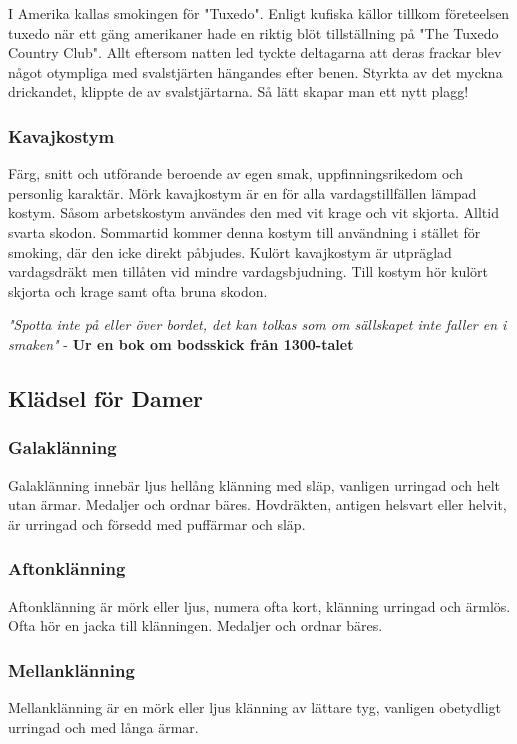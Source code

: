I Amerika kallas smokingen för "Tuxedo". Enligt kufiska källor tillkom företeelsen tuxedo när ett gäng amerikaner hade en riktig blöt tillställning på "The Tuxedo Country Club". Allt eftersom natten led tyckte deltagarna att deras frackar blev något otympliga med svalstjärten hängandes efter benen. Styrkta av det myckna drickandet, klippte de av svalstjärtarna. Så lätt skapar man ett nytt plagg!

\subsubsection*{\textbf{Kavajkostym}}

Färg, snitt och utförande beroende av egen smak, uppfinningsrikedom och personlig karaktär. Mörk kavajkostym är en för alla vardagstillfällen lämpad kostym. Såsom arbetskostym användes den med vit krage och vit skjorta. Alltid svarta skodon. Sommartid kommer denna kostym till användning i stället för smoking, där den icke direkt påbjudes. Kulört kavajkostym är utpräglad vardagsdräkt men tillåten vid mindre vardagsbjudning. Till kostym hör kulört skjorta och krage samt ofta bruna skodon.

\textit{"Spotta inte på eller över bordet, det kan tolkas som om sällskapet inte faller en i smaken"} - \textbf{Ur en bok om bodsskick från 1300-talet}

\subsection*{\textbf{Klädsel för Damer}}
\subsubsection*{\textbf{Galaklänning}}
Galaklänning innebär ljus hellång klänning med släp, vanligen urringad och helt utan ärmar. Medaljer och ordnar bäres. Hovdräkten, antigen helsvart eller helvit, är urringad och försedd med puffärmar och släp.

\subsubsection*{\textbf{Aftonklänning}}
Aftonklänning är mörk eller ljus, numera ofta kort, klänning urringad och ärmlös. Ofta hör en jacka till klänningen. Medaljer och ordnar bäres.

\subsubsection*{\textbf{Mellanklänning}}
Mellanklänning är en mörk eller ljus klänning av lättare tyg, vanligen obetydligt urringad och med långa ärmar.

